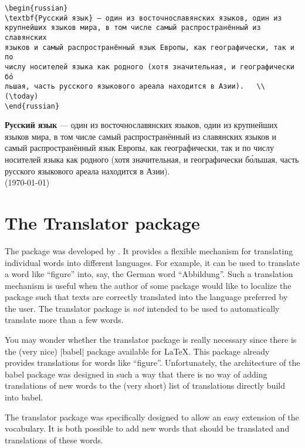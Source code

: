 \bottomline

\begin{verbatim}
\begin{russian}
\textbf{Русский язык} — один из восточнославянских языков, один из 
крупнейших языков мира, в том числе самый распространённый из славянских
языков и самый распространённый язык Европы, как географически, так и по
числу носителей языка как родного (хотя значительная, и географически бо́
льшая, часть русского языкового ареала находится в Азии).	\\
(\today)
\end{russian}
\end{verbatim}



\textbf{Русский язык} — один из восточнославянских языков, один из крупнейших языков мира, в том числе самый распространённый из славянских языков и самый распространённый язык Европы, как географически, так и по числу носителей языка как родного (хотя значительная, и географически бо́льшая, часть русского языкового ареала находится в Азии).	\\
(\today)


\section{The Translator package}

The  package was developed by  \citep{translator}. It provides a flexible
mechanism for translating individual words into different languages.
For example, it can be used to translate a word like ``figure'' into,
say, the German word ``Abbildung''. Such a translation mechanism is
useful when the author of some package would like to localize the
package such that texts are correctly translated into the language
preferred by the user. The translator package is \emph{not} intended
to be used to automatically translate more than a few words. 

You may wonder whether the translator package is really necessary
since there is the (very nice) |babel| package available for
\LaTeX. This package already provides translations for words like
``figure''. Unfortunately, the architecture of the babel package was
designed in such a way that there is no way of adding translations of
new words to the (very short) list of translations directly build into
babel.

The translator package was specifically designed to allow an easy
extension of the vocabulary. It is both possible to add new words that
should be translated and translations of these words.

